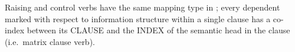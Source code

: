 

Raising and control verbs have the same mapping type in
; every dependent marked with respect to information
structure within a single clause has a co-index between its CLAUSE and
the INDEX of the semantic head in the clause (i.e.\ matrix clause
verb).



